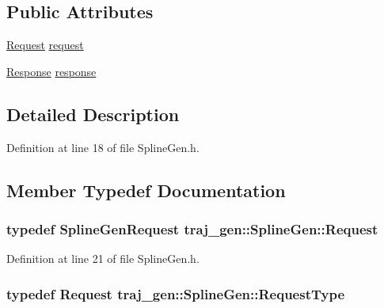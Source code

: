 \subsection*{Public Attributes}
\begin{DoxyCompactItemize}
\item 
\hyperlink{structtraj__gen_1_1_spline_gen_ab96a82d9b2fbbf58a10b9b109a33a515}{Request} \hyperlink{structtraj__gen_1_1_spline_gen_ab08d03a5f1341e017a4af0b6b79280a9}{request}
\item 
\hyperlink{structtraj__gen_1_1_spline_gen_ab9c7eb3601b97640e160b4b49722c069}{Response} \hyperlink{structtraj__gen_1_1_spline_gen_a241b2306f56428d950217247ab9946ec}{response}
\end{DoxyCompactItemize}


\subsection{Detailed Description}


Definition at line 18 of file Spline\+Gen.\+h.



\subsection{Member Typedef Documentation}
\subsubsection[{\texorpdfstring{Request}{Request}}]{\setlength{\rightskip}{0pt plus 5cm}typedef {\bf Spline\+Gen\+Request} {\bf traj\+\_\+gen\+::\+Spline\+Gen\+::\+Request}}\hypertarget{structtraj__gen_1_1_spline_gen_ab96a82d9b2fbbf58a10b9b109a33a515}{}\label{structtraj__gen_1_1_spline_gen_ab96a82d9b2fbbf58a10b9b109a33a515}


Definition at line 21 of file Spline\+Gen.\+h.

\subsubsection[{\texorpdfstring{Request\+Type}{RequestType}}]{\setlength{\rightskip}{0pt plus 5cm}typedef {\bf Request} {\bf traj\+\_\+gen\+::\+Spline\+Gen\+::\+Request\+Type}}\hypertarget{structtraj__gen_1_1_spline_gen_a2482f67c0e1cdd141df845186e9a8cd4}{}\label{structtraj__gen_1_1_spline_gen_a2482f67c0e1cdd141df845186e9a8cd4}



